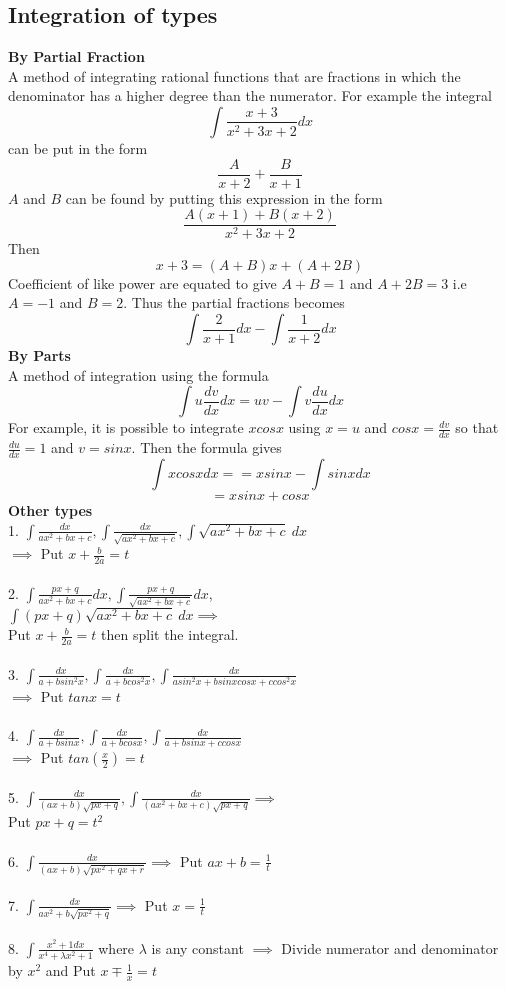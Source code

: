 \documentclass[twocolumn, 10pt]{article}
\begin{document}
\subsection{Integration of types}
\textbf{By Partial Fraction} \\
A method of integrating rational functions that are fractions in which the denominator has a higher degree than the numerator. For example
the integral $$\int \frac{x+3}{x^2+3x+2}dx$$
can be put in the form $$\frac{A}{x+2} +\frac{B}{x+1}$$
$A$ and $B$ can be found by putting this expression in the form $$\frac{A(x+1)+B(x+2)}{x^2+3x+2}$$ Then $$x+3=(A+B)x+(A+2B)$$ Coefficient of like power are equated to give $A+B=1$ and $A+2B=3$ i.e $A=-1$ and $B=2$. Thus the partial fractions becomes $$\int \frac{2}{x+1}dx - \int \frac{1}{x+2}dx$$
\textbf{By Parts} \\
A method of integration using the formula $$\int u \frac{dv}{dx}dx=uv-\int v \frac{du}{dx}dx$$ For example, it is possible to integrate $xcosx$ using $x=u$ and $cosx = \frac{dv}{dx}$ so that $\frac{du}{dx}=1$
and $v=sinx.$ Then the formula gives $$\int xcosxdx==xsinx- \int sinxdx$$ $$=xsinx+cosx$$
\textbf{Other types}\\
1. $\int \frac{dx}{ax^2+bx+c},\int \frac{dx}{\sqrt{ax^2+bx+c}},\int \sqrt{ax^2+bx+c} \medspace dx$\\ $\implies$ Put $x+\frac{b}{2a}=t$\\ \\
2. $\int \frac{px+q}{ax^2+bx+c}dx,\int \frac{px+q}{\sqrt{ax^2+bx+c}}dx$,\\$\int(px+q)\sqrt{ax^2+bx+c} \medspace dx \implies$ \\
Put $x+\frac{b}{2a}=t$ then split the integral. \\ \\
3. $\int \frac{dx}{a+bsin^2x}, \int \frac{dx}{a+bcos^2x},\int \frac{dx}{asin^2x+bsinxcosx+ccos^2x}$ \\
$\implies$ Put $tanx=t$ \\ \\
4. $\int \frac{dx}{a+bsinx}, \int \frac{dx}{a+bcosx},\int \frac{dx}{a+bsinx+ccosx}$ \\
$\implies$ Put $tan(\frac{x}{2})=t$ \\ \\
5. $\int \frac{dx}{(ax+b)\sqrt{px+q}},\int \frac{dx}{(ax^2+bx+c)\sqrt{px+q}} \implies$ \\
Put $px+q=t^2$ \\\\
6. $\int \frac{dx}{(ax+b)\sqrt{px^2+qx+r}} \implies$ Put $ax+b=\frac{1}{t}$ \\\\
7. $\int \frac{dx}{ax^2+b\sqrt{px^2+q}} \implies$ Put $x=\frac{1}{t}$ \\\\
8. $\int \frac{x^2+1dx}{x^4+\lambda x^2+1}$ where $\lambda$ is any constant $\implies$ Divide numerator and denominator by $x^2$ and Put $x \mp \frac{1}{x}=t$
\end{document}
